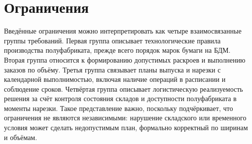  \section{Ограничения}
 Введённые ограничения можно интерпретировать как четыре взаимосвязанные группы требований. Первая группа описывает технологические правила производства полуфабриката, прежде всего порядок марок бумаги на БДМ. Вторая группа относится к формированию допустимых раскроев и выполнению заказов по объёму. Третья группа связывает планы выпуска и нарезки с календарной выполнимостью, включая наличие операций в расписании и соблюдение сроков. Четвёртая группа описывает логистическую реализуемость решения за счёт контроля состояния складов и доступности полуфабриката в моменты нарезки. Такое представление важно, поскольку подчёркивает, что ограничения не являются независимыми: нарушение складского или временного условия может сделать недопустимым план, формально корректный по ширинам и объёмам.
